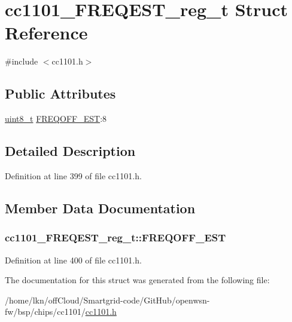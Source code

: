 \hypertarget{structcc1101___f_r_e_q_e_s_t__reg__t}{}\section{cc1101\+\_\+\+F\+R\+E\+Q\+E\+S\+T\+\_\+reg\+\_\+t Struct Reference}
\label{structcc1101___f_r_e_q_e_s_t__reg__t}


{\ttfamily \#include $<$cc1101.\+h$>$}

\subsection*{Public Attributes}
\begin{DoxyCompactItemize}
\item 
\hyperlink{_p_e___types_8h_aba7bc1797add20fe3efdf37ced1182c5}{uint8\+\_\+t} \hyperlink{structcc1101___f_r_e_q_e_s_t__reg__t_ad6aad69bcdd2f2e5b60b102a12b1b54e}{F\+R\+E\+Q\+O\+F\+F\+\_\+\+E\+ST}\+:8
\end{DoxyCompactItemize}


\subsection{Detailed Description}


Definition at line 399 of file cc1101.\+h.



\subsection{Member Data Documentation}
\subsubsection[{\texorpdfstring{F\+R\+E\+Q\+O\+F\+F\+\_\+\+E\+ST}{FREQOFF_EST}}]{ cc1101\+\_\+\+F\+R\+E\+Q\+E\+S\+T\+\_\+reg\+\_\+t\+::\+F\+R\+E\+Q\+O\+F\+F\+\_\+\+E\+ST}\hypertarget{structcc1101___f_r_e_q_e_s_t__reg__t_ad6aad69bcdd2f2e5b60b102a12b1b54e}{}\label{structcc1101___f_r_e_q_e_s_t__reg__t_ad6aad69bcdd2f2e5b60b102a12b1b54e}


Definition at line 400 of file cc1101.\+h.



The documentation for this struct was generated from the following file\+:\begin{DoxyCompactItemize}
\item 
/home/lkn/off\+Cloud/\+Smartgrid-\/code/\+Git\+Hub/openwsn-\/fw/bsp/chips/cc1101/\hyperlink{cc1101_8h}{cc1101.\+h}\end{DoxyCompactItemize}
